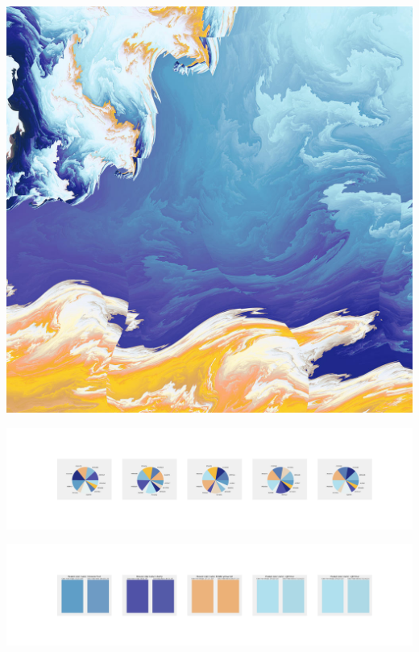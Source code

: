 \documentclass[11pt]{article}
\begin{document}
\begin{landscape}
    \begin{center}
    \includegraphics[width=\textwidth]{./nbimg/file (415).jpg}
    \end{center}

    \begin{center}
    \includegraphics[width=250mm]{./nbimg/pie-351.jpg}
    \end{center}

    \begin{center}
    \includegraphics[width=250mm]{./nbimg/peak-351.jpg}
    \end{center}
    


\end{landscape}
\end{document}
